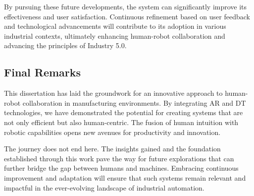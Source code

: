 By pursuing these future developments, the system can significantly improve its effectiveness and user satisfaction. Continuous refinement based on user feedback and technological advancements will contribute to its adoption in various industrial contexts, ultimately enhancing human-robot collaboration and advancing the principles of Industry 5.0.

\subsection{Final Remarks}

This dissertation has laid the groundwork for an innovative approach to human-robot collaboration in manufacturing environments. By integrating AR and DT technologies, we have demonstrated the potential for creating systems that are not only efficient but also human-centric. The fusion of human intuition with robotic capabilities opens new avenues for productivity and innovation.

The journey does not end here. The insights gained and the foundation established through this work pave the way for future explorations that can further bridge the gap between humans and machines. Embracing continuous improvement and adaptation will ensure that such systems remain relevant and impactful in the ever-evolving landscape of industrial automation.